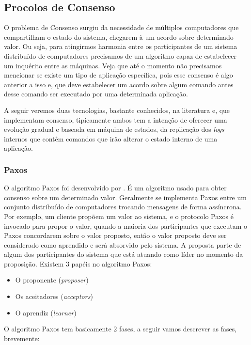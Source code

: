 \subsection{Procolos de Consenso}

O problema de Consenso surgiu da necessidade de múltiplos computadores que compartilham o estado do sistema, chegarem à um acordo sobre determinado valor. Ou seja, para atingirmos harmonia entre os participantes de um sistema distribuído de computadores precisamos de um algoritmo capaz de estabelecer um inquérito entre as máquinas. Veja que até o momento não precisamos mencionar se existe um tipo de aplicação específica, pois esse consenso é algo anterior a isso e, que deve estabelecer um acordo sobre algum comando antes desse comando ser executado por uma determinada aplicação.

A seguir veremos duas tecnologias, bastante conhecidos, na literatura e, que implementam consenso, tipicamente ambos tem a intenção de oferecer uma evolução gradual e baseada em máquina de estados, da replicação dos \textit{logs} internos que contêm comandos que irão alterar o estado interno de uma aplicação.

\subsubsection{Paxos}

O algoritmo Paxos foi desenvolvido por \cite{lamport2001paxos}. É um algoritmo usado para obter consenso sobre um determinado valor. Geralmente se implementa Paxos entre um conjunto distribuído de computadores trocando mensagens de forma assíncrona. Por exemplo, um cliente propõem um valor ao sistema, e o protocolo Paxos é invocado para propor o valor, quando a maioria dos participantes que executam o Paxos concordarem sobre o valor proposto, então o valor proposto deve ser considerado como aprendido e será absorvido pelo sistema. A proposta parte de algum dos participantes do sistema que está atuando como líder no momento da proposição. Existem 3 papéis no algoritmo Paxos:

\begin{itemize}
\item O proponente (\textit{proposer})
\item Os aceitadores (\textit{acceptors})
\item O aprendiz (\textit{learner})
\end{itemize}

O algoritmo Paxos tem basicamente 2 fases, a seguir vamos descrever as fases, brevemente:

